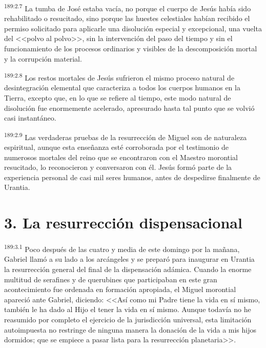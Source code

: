 \par 
\textsuperscript{189:2.7} La tumba de José estaba vacía, no porque el cuerpo de Jesús había sido rehabilitado o resucitado, sino porque las huestes celestiales habían recibido el permiso solicitado para aplicarle una disolución especial y excepcional, una vuelta del <<polvo al polvo>>, sin la intervención del paso del tiempo y sin el funcionamiento de los procesos ordinarios y visibles de la descomposición mortal y la corrupción material.

\par 
\textsuperscript{189:2.8} Los restos mortales de Jesús sufrieron el mismo proceso natural de desintegración elemental que caracteriza a todos los cuerpos humanos en la Tierra, excepto que, en lo que se refiere al tiempo, este modo natural de disolución fue enormemente acelerado, apresurado hasta tal punto que se volvió casi instantáneo.

\par 
\textsuperscript{189:2.9} Las verdaderas pruebas de la resurrección de Miguel son de naturaleza espiritual, aunque esta enseñanza esté corroborada por el testimonio de numerosos mortales del reino que se encontraron con el Maestro morontial resucitado, lo reconocieron y conversaron con él. Jesús formó parte de la experiencia personal de casi mil seres humanos, antes de despedirse finalmente de Urantia.

\section*{3. La resurrección dispensacional}
\par 
\textsuperscript{189:3.1} Poco después de las cuatro y media de este domingo por la mañana, Gabriel llamó a su lado a los arcángeles y se preparó para inaugurar en Urantia la resurrección general del final de la dispensación adámica. Cuando la enorme multitud de serafines y de querubines que participaban en este gran acontecimiento fue ordenada en formación apropiada, el Miguel morontial apareció ante Gabriel, diciendo: <<Así como mi Padre tiene la vida en sí mismo, también le ha dado al Hijo el tener la vida en sí mismo. Aunque todavía no he reasumido por completo el ejercicio de la jurisdicción universal, esta limitación autoimpuesta no restringe de ninguna manera la donación de la vida a mis hijos dormidos; que se empiece a pasar lista para la resurrección planetaria>>.

